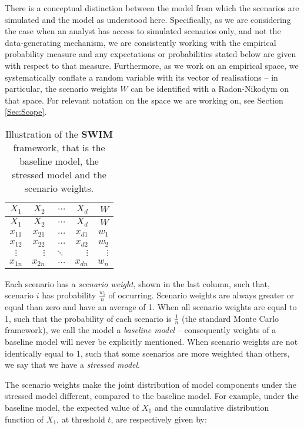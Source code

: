 \documentclass[
]{article}
\begin{document}
There is a conceptual distinction between the model from which the scenarios are simulated and the model as understood here. Specifically, as we are considering the case when an analyst has access to simulated scenarios only, and not the data-generating mechanism, we are consistently working with the empirical probability measure and any expectations or probabilities stated below are given with respect to that measure. Furthermore, as we work on an empirical space, we systematically conflate a random variable with its vector of realisations -- in particular, the scenario weights \(W\) can be identified with a Radon-Nikodym on that space. For relevant notation on the space we are working on, see Section \ref{Sec:Scope}.

\begin{longtable}[]{@{}crrrr@{}}
\caption{\label{tab:SWIMframework} Illustration of the \textbf{SWIM} framework, that is the baseline model, the stressed model and the scenario weights.}\tabularnewline
\toprule
\(X_1\) & \(X_2\) & \(\dots\) & \(X_d\) & \(W\)\tabularnewline
\midrule
\endfirsthead
\toprule
\(X_1\) & \(X_2\) & \(\dots\) & \(X_d\) & \(W\)\tabularnewline
\midrule
\endhead
\(x_{11}\) & \(x_{21}\) & \(\dots\) & \(x_{d1}\) & \(w_1\)\tabularnewline
\(x_{12}\) & \(x_{22}\) & \(\dots\) & \(x_{d2}\) & \(w_2\)\tabularnewline
\(\vdots\) & \(\vdots\) & \(\ddots\) & \(\vdots\) & \(\vdots\)\tabularnewline
\(x_{1n}\) & \(x_{2n}\) & \(\dots\) & \(x_{dn}\) & \(w_n\)\tabularnewline
\bottomrule
\end{longtable}

Each scenario has a \emph{scenario weight}, shown in the last column, such that, scenario \(i\) has probability \(\frac{w_i}{n}\) of occurring. Scenario weights are always greater or equal than zero and have an average of 1. When all scenario weights are equal to 1, such that the probability of each scenario is \(\frac 1 n\) (the standard Monte Carlo framework), we call the model a \emph{baseline model} -- consequently weights of a baseline model will never be explicitly mentioned. When scenario weights are not identically equal to 1, such that some scenarios are more weighted than others, we say that we have a \emph{stressed model}.

The scenario weights make the joint distribution of model components under the stressed model different, compared to the baseline model. For example, under the baseline model, the expected value of \(X_1\) and the cumulative distribution function of \(X_1\), at threshold \(t\), are respectively given by:
\end{document}
